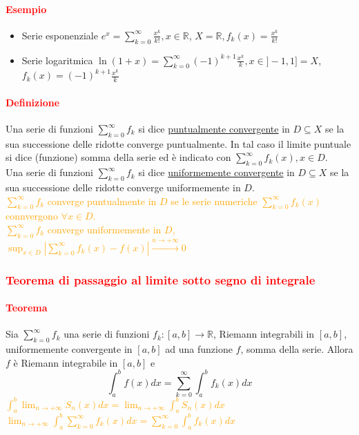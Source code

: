 \documentclass{article}
\newcommand{\R}{\mathbb{R}}
\begin{document}
\paragraph{\textcolor{red}{Esempio}}
\begin{itemize}
    \item Serie esponenziale $e^x= \sum_{k=0}^{\infty}\frac{x^k}{k!}, x \in \R$, $X=\R, f_k (x)= \frac{ x^k}{k!}$
    \item Serie logaritmica $\ln (1+x)= \sum_{k=0}^{\infty}(-1)^{k+1}\frac{x^k}{k}, x \in ]-1,1]=X$, $ f_k(x)=(-1)^{k+1}\frac{x^k}{k}$
\end{itemize}

\paragraph{\textcolor{red}{Definizione}}
Una serie di funzioni $\sum_{k=0}^{\infty} f_k$ si dice \underline{puntualmente convergente} in $D \subseteq X$ se la sua successione delle ridotte converge puntualmente. In tal caso il limite puntuale si dice (funzione) somma della serie ed è indicato con $\sum_{k=0}^{\infty}f_k(x), x \in D$.\\ Una serie di funzioni $\sum_{k=0}^{\infty}f_k$ si dice \underline{uniformemente convergente} in $D \subseteq X$ se la sua successione delle ridotte converge uniformemente in $D$.\\
\textcolor{orange}{$\sum_{k=0}^{\infty}f_k$ converge puntualmente in $D$ se le serie numeriche $\sum_{k=0}^{\infty}f_k(x)$ connvergono $\forall x \in D$.}\\
\textcolor{orange}{$\sum_{k=0}^{\infty}f_k$ converge uniformemente in $D$, $\sup_{x \in D}|\sum_{k=0}^{\infty}f_k(x)-f(x)|\xrightarrow{n \rightarrow+\infty}0$}\\

\subsubsection{\textcolor{red}{Teorema di passaggio al limite sotto segno di integrale}}
\paragraph{\textcolor{red}{Teorema}}
Sia $\sum_{k=0}^{\infty}f_k$ una serie di funzioni $f_k: [a,b]\rightarrow \R$, Riemann integrabili in $[a,b]$, uniformemente convergente in $[a,b]$ ad una funzione $f$, somma della serie. Allora $f$ è Riemann integrabile in $[a,b]$ e 
\begin{equation*}
    \int_{a}^{b}f(x)dx=\sum_{k=0}^{\infty}\int_{a}^{b}f_k(x)dx
\end{equation*}
\textcolor{orange}{$\int_{a}^{b}\lim_{n\rightarrow +\infty}S_n(x)dx=\lim_{n\rightarrow +\infty}\int_{a}^{b}S_n (x)dx$}\\
\textcolor{orange}{$\lim_{n\rightarrow +\infty}\int_{a}^{b}\sum_{k=0}^{\infty}f_k(x)dx= \sum_{k=0}^{\infty}\int_{a}^{b}f_k(x)dx$}
\end{document}
